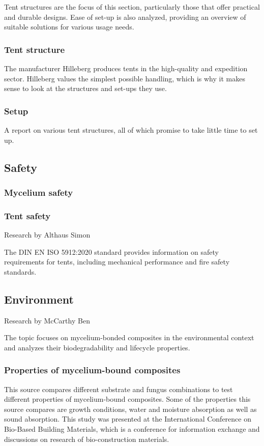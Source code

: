 \documentclass{article}
\begin{document}
Tent structures are the focus of this section, particularly those that offer practical and
durable designs. Ease of set-up is also analyzed, providing an overview of suitable
solutions for various usage needs.

\subsubsection{Tent structure}
The manufacturer Hilleberg produces tents in the high-quality and expedition sector.
Hilleberg values the simplest possible handling, which is why it makes sense to look at
the structures and set-ups they use.\\


\subsubsection{Setup}
A report on various tent structures, all of which promise to take little time to set up.\\


\subsection{Safety}
\subsubsection{Mycelium safety}
\subsubsection{Tent safety}
{\small Research by Althaus Simon}

The DIN EN ISO 5912:2020 standard provides information on safety requirements for tents,
including mechanical performance and fire safety standards.\\


\subsection{Environment}
{\small Research by McCarthy Ben}

The topic focuses on mycelium-bonded composites in the environmental context and
analyzes their biodegradability and lifecycle properties.

\subsubsection{Properties of mycelium-bound composites}
This source compares different substrate and fungus combinations to test different
properties of mycelium-bound composites. Some of the properties this source compares are
growth conditions, water and moisture absorption as well as sound absorption. This study
was presented at the International Conference on Bio-Based Building Materials, which is a
conference for information exchange and discussions on research of bio-construction
materials.\\
\end{document}
